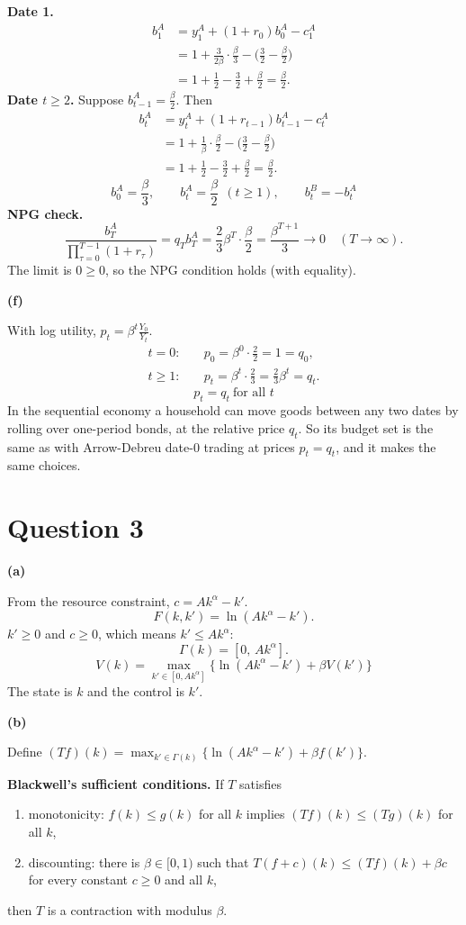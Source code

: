 \documentclass[12pt]{article}
\newcommand{\pt}[1]{\par\bigskip\textbf{(#1)}\par}
\newcommand{\ans}[1]{\[\boxed{\ #1\ }\]}
\begin{document}
\textbf{Date 1.}
\begin{align*}
b^A_1&=y^A_1+(1+r_0)b^A_0-c^A_1\\
&=1+\frac{3}{2\beta}\cdot\frac\beta3-\Big(\frac32-\frac\beta2\Big)\\
&=1+\frac12-\frac32+\frac\beta2=\frac\beta2 .
\end{align*}
\textbf{Date $t\ge2$.} Suppose $b^A_{t-1}=\frac\beta2$. Then
\begin{align*}
b^A_t&=y^A_t+(1+r_{t-1})b^A_{t-1}-c^A_t\\
&=1+\frac1\beta\cdot\frac\beta2-\Big(\frac32-\frac\beta2\Big)\\
&=1+\frac12-\frac32+\frac\beta2=\frac\beta2 .
\end{align*}
\ans{b^A_0=\frac\beta3,\qquad b^A_t=\frac\beta2\ \ (t\ge1),\qquad b^B_t=-b^A_t}
\textbf{NPG check.}
\[
\frac{b^A_T}{\prod_{\tau=0}^{T-1}(1+r_\tau)}=q_Tb^A_T=\frac23\beta^T\cdot\frac\beta2=\frac{\beta^{T+1}}{3}\longrightarrow0\quad(T\to\infty).
\]
The limit is $0\ge0$, so the NPG condition holds (with equality).

\pt{f}
With log utility, $p_t=\beta^t\frac{Y_0}{Y_t}$.
\begin{align*}
t=0:&\quad p_0=\beta^0\cdot\frac22=1=q_0,\\
t\ge1:&\quad p_t=\beta^t\cdot\frac23=\frac23\beta^t=q_t .
\end{align*}
\ans{p_t=q_t\ \text{for all }t}
In the sequential economy a household can move goods between any two dates
by rolling over one-period bonds, at the relative price $q_t$. So its budget
set is the same as with Arrow-Debreu date-0 trading at prices $p_t=q_t$,
and it makes the same choices.

\section*{Question 3}

\pt{a}
From the resource constraint, $c=Ak^\alpha-k'$.
\[
F(k,k')=\ln(Ak^\alpha-k').
\]
$k'\ge0$ and $c\ge0$, which means $k'\le Ak^\alpha$:
\[
\Gamma(k)=[0,\,Ak^\alpha].
\]
\ans{V(k)=\max_{k'\in[0,Ak^\alpha]}\big\{\ln(Ak^\alpha-k')+\beta V(k')\big\}}
The state is $k$ and the control is $k'$.

\pt{b}
Define $(Tf)(k)=\max_{k'\in\Gamma(k)}\{\ln(Ak^\alpha-k')+\beta f(k')\}$.

\textbf{Blackwell's sufficient conditions.} If $T$ satisfies
\begin{enumerate}
\item monotonicity: $f(k)\le g(k)$ for all $k$ implies $(Tf)(k)\le(Tg)(k)$ for all $k$,
\item discounting: there is $\beta\in[0,1)$ such that $T(f+c)(k)\le(Tf)(k)+\beta c$ for every constant $c\ge0$ and all $k$,
\end{enumerate}
then $T$ is a contraction with modulus $\beta$.
\end{document}

